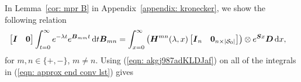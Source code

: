 In Lemma~\ref{cor: mpr B} in Appendix~\ref{appendix: kronecker}, we show the following relation
\begin{align}
	\vligne{\bs I & \bs 0 }\int_{t=0}^\infty e^{-\lambda t} e^{\bs{B}_{mm}t} \wrt t \bs{B}_{m{n}} %
	&= \int_{x=0}^\infty \left(\bs H^{mn}(\lambda,x) \vligne{\bs I_n & \bs 0_{n\times |\calS_0|}}\right) \otimes  e^{\bs S x}\bs D\wrt x, \label{eqn: akgj987adKLDJaf}
\end{align}
for \(m,n\in\{+,-\}\), \(m\neq n\). Using (\ref{eqn: akgj987adKLDJaf}) on all of the integrals in (\ref{eqn: approx end conv lst}) gives
